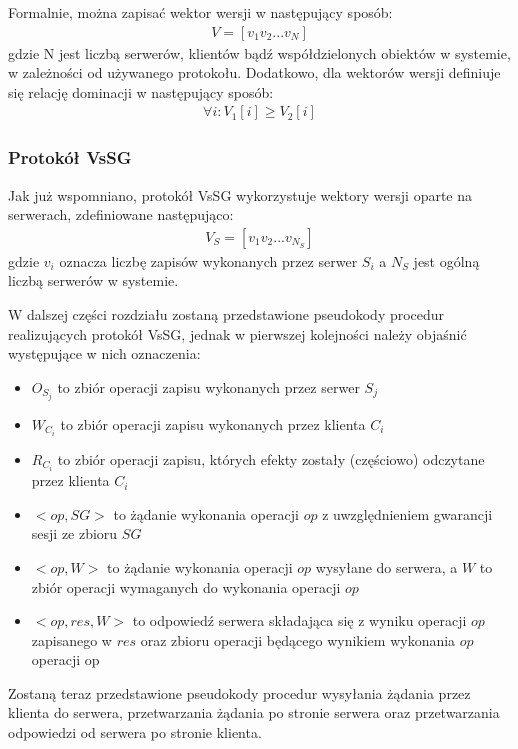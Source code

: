 Formalnie, można zapisać wektor wersji w następujący sposób:
\begin{align*}
    V = [v_1 v_2 ... v_N]
\end{align*}
gdzie N jest liczbą serwerów, klientów bądź współdzielonych obiektów w systemie, w zależności od używanego protokołu. Dodatkowo, dla wektorów wersji definiuje się relację dominacji w następujący sposób:
\begin{align*}
    \forall{i}: V_1[i] \geqslant V_2[i] 
\end{align*}

\subsubsection{Protokół VsSG}

Jak już wspomniano, protokół VsSG wykorzystuje wektory wersji oparte na serwerach, zdefiniowane następująco:
\begin{align*}
    V_S = [v_1 v_2 ... v_{N_S}]
\end{align*}
gdzie $ v_i $ oznacza liczbę zapisów wykonanych przez serwer $ S_i $ a $ N_S $ jest ogólną liczbą serwerów w systemie.

W dalszej części rozdziału zostaną przedstawione pseudokody procedur realizujących protokół VsSG, jednak w pierwszej kolejności należy objaśnić występujące w nich oznaczenia:
\begin{itemize}
    \item $ O_{S_j} $ to zbiór operacji zapisu wykonanych przez serwer $ S_j $
    \item $ W_{C_i} $ to zbiór operacji zapisu wykonanych przez klienta $ C_i $
    \item $ R_{C_i} $ to zbiór operacji zapisu, których efekty zostały (częściowo) odczytane przez klienta $ C_i $
    \item $ <op, SG> $ to żądanie wykonania operacji $ op $ z uwzględnieniem gwarancji sesji ze zbioru $ SG $
    \item $ <op, W> $ to żądanie wykonania operacji $ op $ wysyłane do serwera, a $ W $ to zbiór operacji wymaganych do wykonania operacji $ op $
    \item $ <op, res, W> $ to odpowiedź serwera składająca się z wyniku operacji $ op $ zapisanego w $ res $ oraz zbioru operacji będącego wynikiem wykonania $ op $
operacji op
\end{itemize}

Zostaną teraz przedstawione pseudokody procedur wysyłania żądania przez klienta do serwera, przetwarzania żądania po stronie serwera oraz przetwarzania odpowiedzi od serwera po stronie klienta.

